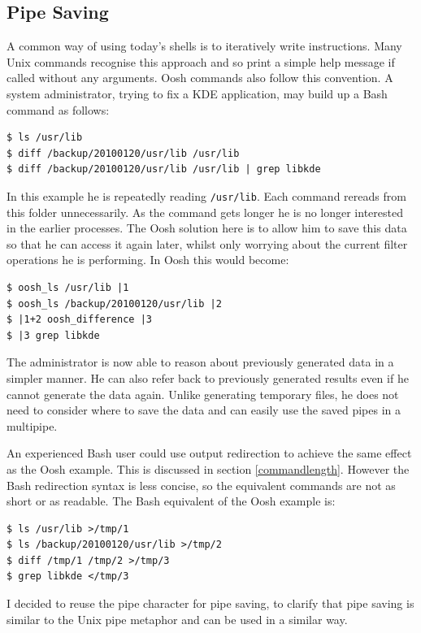 \documentclass[12pt,twoside,notitlepage]{report}
\begin{document}
\subsection{Pipe Saving}
A common way of using today's shells is to iteratively write
instructions. Many Unix commands recognise this approach and so print
a simple help message if called without any arguments. Oosh commands
also follow this convention. A system
administrator, trying to fix a KDE application, may build up a Bash
command as follows:

\begin{verbatim}
$ ls /usr/lib
$ diff /backup/20100120/usr/lib /usr/lib
$ diff /backup/20100120/usr/lib /usr/lib | grep libkde
\end{verbatim}

In this example he is repeatedly reading {\tt /usr/lib}. Each command
rereads from this folder unnecessarily. As the command gets longer he
is no longer interested in the earlier processes. The Oosh solution
here is to allow him to save this data so that he can access it again
later, whilst only worrying about the current filter operations he is
performing. In Oosh this would become:

\begin{verbatim}
$ oosh_ls /usr/lib |1
$ oosh_ls /backup/20100120/usr/lib |2
$ |1+2 oosh_difference |3
$ |3 grep libkde
\end{verbatim}

The administrator is now able to reason about previously generated data in a
simpler manner. He can also refer back to previously generated results
even if he cannot generate the data again. Unlike generating temporary
files, he does not need to consider where to save the data and can
easily use the saved pipes in a multipipe.

An experienced Bash user could use output redirection to achieve the
same effect as the Oosh example. This is discussed in section
\ref{commandlength}. However the Bash redirection syntax is less
concise, so the equivalent commands are not as short or as
readable. The Bash equivalent of the Oosh example is:

\begin{verbatim}
$ ls /usr/lib >/tmp/1
$ ls /backup/20100120/usr/lib >/tmp/2
$ diff /tmp/1 /tmp/2 >/tmp/3
$ grep libkde </tmp/3
\end{verbatim}

I decided to reuse the pipe character for pipe saving, to clarify that
pipe saving is similar to the Unix pipe metaphor and can be used in a
similar way.
\end{document}
